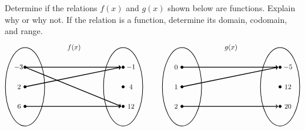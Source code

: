 \documentclass[11pt,letterpaper]{article}
\begin{document}

 Determine if the relations $f(x)$ and $g(x)$ shown below are functions. Explain why or why not. If the relation is a function, determine its domain, codomain, and range. 
	\[
	\begin{tikzpicture}
	\node at (2.5,2) {$f(x)$};
	\draw[line width=0.03cm] (0,0) circle (1 and 2);
	\draw[line width=0.03cm] (5,0) circle (1 and 2);
	
	\draw[fill=black] (0,1) circle (0.07);
	\draw[fill=black] (0,0) circle (0.07);
	\draw[fill=black] (0,-1) circle (0.07);
	
	\draw[fill=black] (5,1) circle (0.07);
	\draw[fill=black] (5,0) circle (0.07);
	\draw[fill=black] (5,-1) circle (0.07);
	
	\draw[line width=0.04cm,->] (0,1) -- (4.9,1);
	\draw[line width=0.04cm,->] (0,1) -- (4.9,-1);
	\draw[line width=0.04cm,->] (0,0) -- (4.9,1);
	\draw[line width=0.04cm,->] (0,-1) -- (4.9,-1);
	
	\node at (-0.3,1) {$\!-3$};
	\node at (-0.3,0) {$2$};
	\node at (-0.3,-1) {$6$};
	
	\node at (5.4,1) {$-1$};
	\node at (5.4,0) {$4$};
	\node at (5.4,-1) {$12$};
	
	\tikzset{shift={(8,0)}}
	\node at (2.5,2) {$g(x)$};
	\draw[line width=0.03cm] (0,0) circle (1 and 2);
	\draw[line width=0.03cm] (5,0) circle (1 and 2);
	
	\draw[fill=black] (0,1) circle (0.07);
	\draw[fill=black] (0,0) circle (0.07);
	\draw[fill=black] (0,-1) circle (0.07);
	
	\draw[fill=black] (5,1) circle (0.07);
	\draw[fill=black] (5,0) circle (0.07);
	\draw[fill=black] (5,-1) circle (0.07);
	
	\draw[line width=0.04cm,->] (0,1) -- (4.9,1);
	\draw[line width=0.04cm,->] (0,0) -- (4.9,1);
	\draw[line width=0.04cm,->] (0,-1) -- (4.9,-1);
	
	\node at (-0.3,1) {$0$};
	\node at (-0.3,0) {$1$};
	\node at (-0.3,-1) {$2$};
	
	\node at (5.4,1) {$-5$};
	\node at (5.4,0) {$12$};
	\node at (5.4,-1) {$20$};
	\end{tikzpicture}
	\] \pspace
\end{document}
